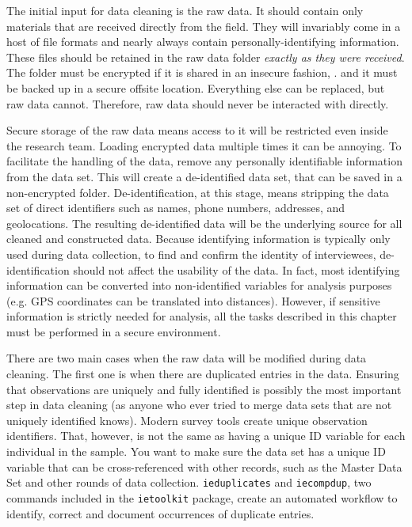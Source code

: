 The initial input for data cleaning is the raw data.
It should contain only materials that are received directly from the field.
They will invariably come in a host of file formats and nearly always contain personally-identifying information.
These files should be retained in the raw data folder \textit{exactly as they were received}.
The folder must be encrypted if it is shared in an insecure fashion,
.
and it must be backed up in a secure offsite location.
Everything else can be replaced, but raw data cannot.
Therefore, raw data should never be interacted with directly.

Secure storage of the raw
data means access to it will be restricted even inside the research team.
Loading encrypted data multiple times it can be annoying.
To facilitate the handling of the data, remove any personally identifiable information from the data set.
This will create a de-identified data set, that can be saved in a non-encrypted folder. 
De-identification,
at this stage, means stripping the data set of direct identifiers such as names, phone numbers, addresses, and geolocations.
The resulting de-identified data will be the underlying source for all cleaned and constructed data.
Because identifying information is typically only used during data collection, 
to find and confirm the identity of interviewees, 
de-identification should not affect the usability of the data.
In fact, most identifying information can be converted into non-identified variables for analysis purposes
(e.g. GPS coordinates can be translated into distances). 
However, if sensitive information is strictly needed for analysis,
all the tasks described in this chapter must be performed in a secure environment.

There are two main cases when the raw data will be modified during data cleaning.
The first one is when there are duplicated entries in the data.
Ensuring that observations are uniquely and fully identified
is possibly the most important step in data cleaning
(as anyone who ever tried to merge data sets that are not uniquely identified knows).
Modern survey tools create unique observation identifiers.
That, however, is not the same as having a unique ID variable for each individual in the sample.
You want to make sure the data set has a unique ID variable
that can be cross-referenced with other records, such as the Master Data Set
and other rounds of data collection.
\texttt{ieduplicates} and \texttt{iecompdup}, 
two commands  included in the \texttt{ietoolkit} package,
create an automated workflow to identify, correct and document
occurrences of duplicate entries. 

